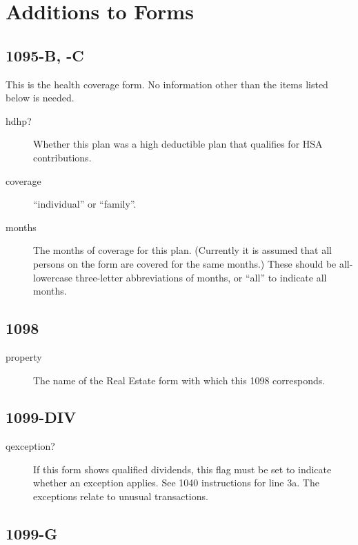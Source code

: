 \section{Additions to Forms}

\subsection{1095-B, -C}

This is the health coverage form. No information other than the items listed
below is needed.

\begin{description}
\item[hdhp?] Whether this plan was a high deductible plan that qualifies for HSA
contributions.
\item[coverage] ``individual'' or ``family''.
\item[months] The months of coverage for this plan. (Currently it is assumed
that all persons on the form are covered for the same months.) These should be
all-lowercase three-letter abbreviations of months, or ``all'' to indicate all
months.
\end{description}

\subsection{1098}

\begin{description}
\item[property] The name of the Real Estate form with which this 1098
corresponds.
\end{description}

\subsection{1099-DIV}

\begin{description}
\item[qexception?] If this form shows qualified dividends, this flag
must be set to indicate whether an exception applies. See 1040 instructions for
line 3a. The exceptions relate to unusual transactions.
\end{description}


\subsection{1099-G}

